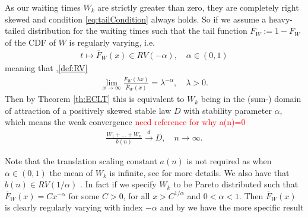 \documentclass[honours,12pt]{UNSWthesis}
\newcommand{\1}{\mathbf 1}
\numberwithin{equation}{section}
\theoremstyle{definition}
\theoremstyle{remark}
\begin{document}
As our waiting times $W_k$ are strictly greater than zero, they are completely right skewed and condition \ref{eq:tailCondition} always holds. So if we assume a heavy-tailed distribution for the waiting times such that the tail function 
$\overline F_W := 1 - F_W$ of the CDF of $W$ is regularly varying, i.e.
\begin{align}
t \mapsto \overline F_W(x) \in RV(-\alpha), \quad \alpha \in (0,1)
\end{align}
meaning that \cite{seneta,thebook},\ref{def:RV}
\begin{align*}
\lim_{x \to \infty}\frac{\overline F_W(\lambda x)}{\overline F_W(x)}
= \lambda^{-\alpha}, \quad \lambda > 0.
\end{align*}
Then by Theorem \ref{th:ECLT}
this is equivalent to $W_k$ being in the 
(sum-) domain of attraction of a positively skewed stable law $D$ with 
stability parameter $\alpha$, which means the weak convergence \textcolor{red}{need reference for why a(n)=0}
\begin{align}
\frac{W_1 + \ldots + W_n}{b(n)} \overset{d}{\longrightarrow} D, \quad n \to \infty.
\end{align}

\noindent Note that the translation scaling constant $a(n)$ is not required as when $\alpha\in(0,1)$ the mean of $W_k$ is infinite, see \cite{MeerschaertStoev08} for more details. We also have that $b(n)\in RV(1/\alpha)$ \cite[Prop~4.15]{MeerschaertSikorskii2012}. In fact if we specify $W_k$ to be Pareto distributed such that $\overline F_W(x)=Cx^{-\alpha}$ for some $C>0$, for all $x>C^{1/\alpha}$ and $0<\alpha<1$. Then $\overline F_W(x)$ is clearly regularly varying with index $-\alpha$ and by \cite[Th~3.37]{MeerschaertSikorskii2012} we have the more specific result
\end{document}
